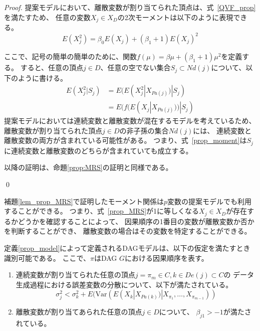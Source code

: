 \begin{proof}
  提案モデルにおいて、離散変数が割り当てられた頂点は、式~\eqref{QVF_prop}を満たすため、
  任意の変数$X_j \in X_D$の2次モーメントは以下のように表現できる。
  \begin{equation*}
    E(X_j^2) = \beta_0 E(X_j) + (\beta_1 + 1)E(X_j)^2
  \end{equation*}

  ここで、記号の簡単の簡単のために、関数$f(\mu) = \beta \mu + (\beta_1 + 1) \mu^2$を定義する。
  すると、任意の頂点$j \in D$、任意の空でない集合$S_j \subset Nd(j)$について、以下のように書ける。
  \begin{equation}
    \begin{split}
      E(X_j^2 | S_j) &= E(E(X_j^2 | X_{Pa(j)}) | S_j) \\
                     &= E(f(E(X_j | X_{Pa(j)})) | S_j)
    \end{split}
    \label{prop_moment}
  \end{equation}
  提案モデルにおいては連続変数と離散変数が混在するモデルを考えているため、
  離散変数が割り当てられた頂点$j \in D$の非子孫の集合$Nd(j)$には、
  連続変数と離散変数の両方が含まれている可能性がある。
  つまり、式~\eqref{prop_moment}は$S_j$に連続変数と離散変数のどちらが含まれていても成立する。

  以降の証明は、命題\ref{prop:MRS}の証明と同様である。

  \qed
\end{proof}

補題\ref{lem_prop_MRS}で証明したモーメント関係は$p$変数の提案モデルでも利用することができる。
つまり、式~\eqref{prop_MRS}が1に等しくなる$X_j \in X_D$が存在するかどうかを確認することによって、
因果順序の1番目の変数が離散変数か否かを判断することができ、
離散変数の場合はその変数を特定することができる。

\begin{theo}[提案モデルの識別可能性]
  \label{theo:prop_identifiability}
  定義\ref{prop_model}によって定義されるDAGモデルは、以下の仮定を満たすとき識別可能である。
  ここで、$\pi$はDAG $G$における因果順序を表す。
  \begin{enumerate}[label=(\Alph*)]
    \item
    連続変数が割り当てられた任意の頂点$j = \pi_m \in C, k \in De(j) \subset C$の
    データ生成過程における誤差変数の分散について、以下が満たされている。
    \begin{equation*}
      \sigma_j^2 < \sigma_k^2 + E(\mathrm{Var}(E(X_k | X_{Pa(k)}) | X_{\pi_1}, \dots, X_{\pi_{m-1}}))
    \end{equation*}

    \item
    離散変数が割り当てあられた任意の頂点$j \in D$について、
    $\beta_{j1} > -1$が満たされている。
  \end{enumerate}
\end{theo}

